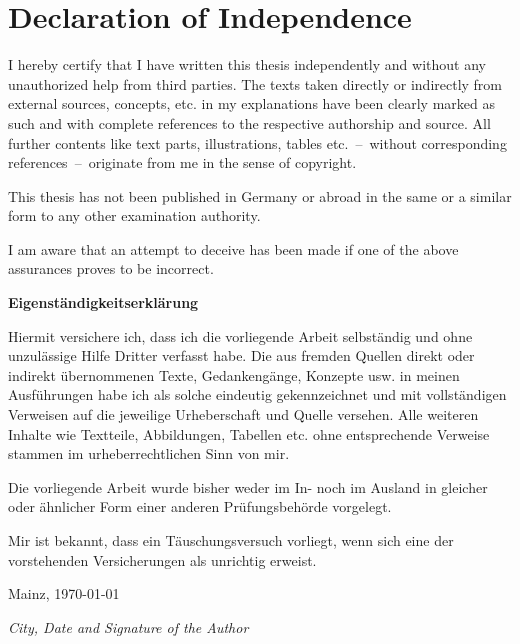 \chapter*{Declaration of Independence}

    I hereby certify that I have written this thesis independently and without any unauthorized help from third parties.
    The texts taken directly or indirectly from external sources, concepts, etc. in my explanations have been clearly marked as such and with complete references to the respective authorship and source.
    All further contents like text parts, illustrations, tables etc.~--~without corresponding references~--~originate from me in the sense of copyright.

    This thesis has not been published in Germany or abroad in the same or a similar form to any other examination authority.

    I am aware that an attempt to deceive has been made if one of the above assurances proves to be incorrect.\par\vspace{2cm}

{\Large\bfseries\sffamily Eigenständigkeitserklärung}\par\bigskip

    Hiermit versichere ich, dass ich die vorliegende Arbeit selbständig und ohne unzulässige Hilfe Dritter verfasst habe.
    Die aus fremden Quellen direkt oder indirekt übernommenen Texte, Gedankengänge, Konzepte usw. in meinen Ausführungen habe ich als solche eindeutig gekennzeichnet und mit vollständigen Verweisen auf die jeweilige Urheberschaft und Quelle versehen.
    Alle weiteren Inhalte wie Textteile, Abbildungen, Tabellen etc. ohne entsprechende Verweise stammen im urheberrechtlichen Sinn von mir.

    Die vorliegende Arbeit wurde bisher weder im In- noch im Ausland in gleicher oder ähnlicher Form einer anderen Prüfungsbehörde vorgelegt.

    Mir ist bekannt, dass ein Täuschungsversuch vorliegt, wenn sich eine der vorstehenden Versicherungen als unrichtig erweist.

    \begin{minipage}[!h]{.8\textwidth}
        \par\vspace{1.2cm}
        \hspace{.5cm}Mainz, \today\hspace{.6cm} \par\vspace{.4cm}
        {\hspace{.5cm}\textit{City, Date and Signature of the Author}}
    \end{minipage}

\clearpage